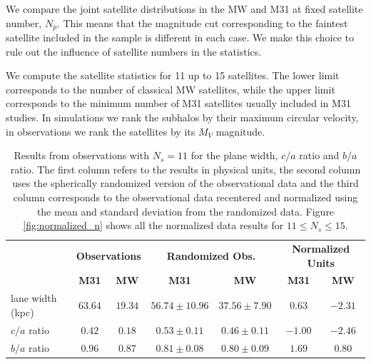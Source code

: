 \documentclass[a4paper,fleqn,usenatbib]{mnras}
\begin{document}
We compare the joint satellite distributions in the MW and M31 at fixed
satellite number, $N_p$.
This means that the magnitude cut corresponding to the faintest
satellite included in the sample is different in each case.
We make this choice to rule out the influence of satellite numbers
in the statistics. 

We compute the satellite statistics for 11 up to 15 satellites.
The lower limit corresponds to the number of classical MW satellites,
while the upper limit corresponds to the minimum number of M31
satellites usually included in M31 studies.
In simulations we rank the subhalos by their maximum circular
velocity, in observations we rank the satellites by its $M_V$
magnitude.  


\begin{table}
  \centering
  \renewcommand{\arraystretch}{1.2}
  \begin{tabular}{|p{2.5cm}|c|c|c|c|c|c|}
    \hline
    \multirow{2}{4.0cm}{} & \multicolumn{2}{c|}{\textbf{Observations}}
    & \multicolumn{2}{c|}{\textbf{Randomized Obs.}} &
    \multicolumn{2}{c|}{\textbf{Normalized Units}}\\
    \cline{2-7}
    & \textbf{M31} & \textbf{MW} & \textbf{M31} & \textbf{MW} & \textbf{M31} & \textbf{MW} \\
    \hline
lane width (kpc) & $63.64$ & $19.34$ & $56.74\pm10.96$ & $37.56\pm7.90$ & $0.63$ & $-2.31$\\\hline
$c/a$ ratio & $0.42$ & $0.18$ & $0.53\pm0.11$ & $0.46\pm0.11$ & $-1.00$ & $-2.46$\\\hline
$b/a$ ratio & $0.96$ & $0.87$ & $0.81\pm0.08$ & $0.80\pm0.09$ & $1.69$ & $0.80$\\\hline
  \end{tabular}
  \caption{Results from observations with $N_s=11$ for the plane width, $c/a$
    ratio and $b/a$ ratio. 
    The first column refers to the results in physical units, the
    second column uses the spherically  randomized version of the 
    observational data and the third column corresponds to the
    observational data recentered and normalized using the mean and standard
    deviation from the randomized data. Figure \ref{fig:normalized_n}
    shows all the normalized data results for $11\leq N_s\leq
    15$\label{table:observations}.}  
\end{table}
\end{document}
